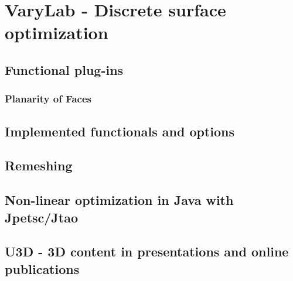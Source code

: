 \documentclass[Thesis.tex]{subfiles}
\begin{document}
\chapter{{\sc VaryLab} - Discrete surface optimization}
\label{sec:varylab}



\section{Functional plug-ins}

\subsection{Planarity of Faces}



\section{Implemented functionals and options}
\section{Remeshing}

\section{Non-linear optimization in {\sc Java} with {\sc Jpetsc/Jtao}}
\label{sec:jpetsctao}

\section{{\sc U3D} - 3D content in presentations and online publications}
\label{sec:u3d}

\subfilebibliography
\end{document}

